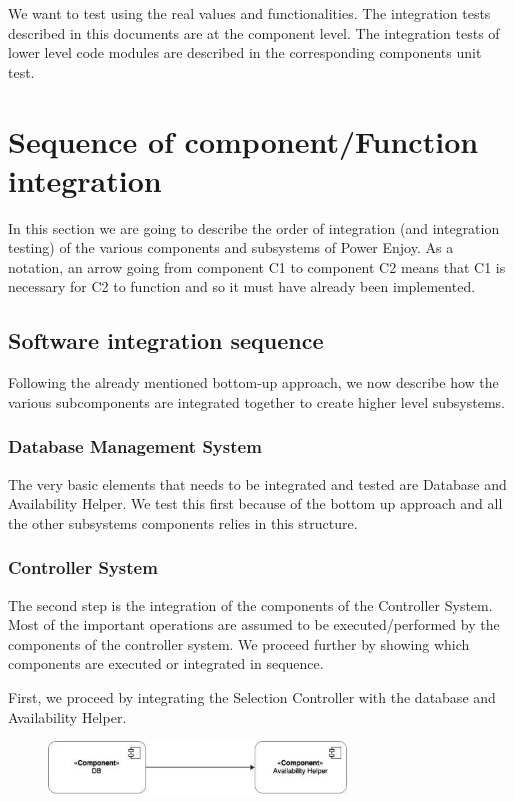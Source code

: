 We want to test using the real values and functionalities. The integration tests described in this documents are at the component level. The integration tests of lower level code modules are described in the corresponding components unit test.

\section{Sequence of component/Function integration}
In this section we are going to describe the order of integration (and integration testing) of the various components and subsystems of Power Enjoy. As a notation, an arrow going from component C1 to component C2 means that C1 is necessary for C2 to function and so it must have already been implemented.

\subsection{Software integration sequence}
Following the already mentioned bottom-up approach, we now describe how the various subcomponents are integrated together to create higher level subsystems.

\subsubsection*{Database Management System}
The very basic elements that needs to be integrated and tested are Database and Availability Helper. We test this first because of the bottom up approach and all the other subsystems components relies in this structure.

\subsubsection*{Controller System}
The second step is the integration of the components of the Controller System. Most of the important operations are assumed to be executed/performed by the components of the controller system. We proceed further by showing which components are executed or integrated in sequence.

First, we proceed by integrating the Selection Controller with the database and Availability Helper.

\begin{figure}[H]
	\centering
	\includegraphics[height=1.4cm,keepaspectratio]{figures/itp1.eps}
	\label{fig:itp1}
\end{figure}

